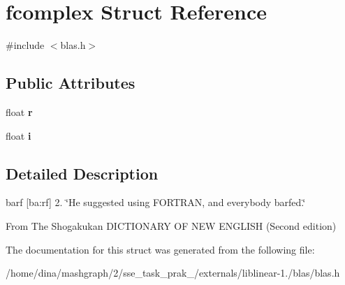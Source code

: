 \hypertarget{structfcomplex}{\section{fcomplex Struct Reference}
\label{structfcomplex}
}


{\ttfamily \#include $<$blas.\-h$>$}

\subsection*{Public Attributes}
\begin{DoxyCompactItemize}
\item 
\hypertarget{structfcomplex_acb47fea25773b05dea5f7fc0e230b89f}{float {\bfseries r}}\label{structfcomplex_acb47fea25773b05dea5f7fc0e230b89f}

\item 
\hypertarget{structfcomplex_a2c937230a96039634973225d7bc88fcc}{float {\bfseries i}}\label{structfcomplex_a2c937230a96039634973225d7bc88fcc}

\end{DoxyCompactItemize}


\subsection{Detailed Description}
barf \mbox{[}ba\-:rf\mbox{]} 2. \char`\"{}\-He suggested using F\-O\-R\-T\-R\-A\-N, and everybody barfed.\char`\"{}


\begin{DoxyItemize}
\item From The Shogakukan D\-I\-C\-T\-I\-O\-N\-A\-R\-Y O\-F N\-E\-W E\-N\-G\-L\-I\-S\-H (Second edition) 
\end{DoxyItemize}

The documentation for this struct was generated from the following file\-:\begin{DoxyCompactItemize}
\item 
/home/dina/mashgraph/2/sse\-\_\-task\-\_\-prak\-\_/externals/liblinear-\/1./blas/blas.\-h\end{DoxyCompactItemize}
